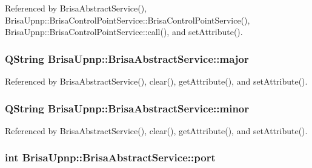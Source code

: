 Referenced by BrisaAbstractService(), BrisaUpnp::BrisaControlPointService::BrisaControlPointService(), BrisaUpnp::BrisaControlPointService::call(), and setAttribute().\hypertarget{classBrisaUpnp_1_1BrisaAbstractService_a1301aa0d68ee3b45dc4158a17d3ab2e9}{
\subsubsection[{major}]{\setlength{\rightskip}{0pt plus 5cm}QString {\bf BrisaUpnp::BrisaAbstractService::major}}}
\label{classBrisaUpnp_1_1BrisaAbstractService_a1301aa0d68ee3b45dc4158a17d3ab2e9}


Referenced by BrisaAbstractService(), clear(), getAttribute(), and setAttribute().\hypertarget{classBrisaUpnp_1_1BrisaAbstractService_a5fedbc9b380612c7c4062b2e25ed3a1c}{
\subsubsection[{minor}]{\setlength{\rightskip}{0pt plus 5cm}QString {\bf BrisaUpnp::BrisaAbstractService::minor}}}
\label{classBrisaUpnp_1_1BrisaAbstractService_a5fedbc9b380612c7c4062b2e25ed3a1c}


Referenced by BrisaAbstractService(), clear(), getAttribute(), and setAttribute().\hypertarget{classBrisaUpnp_1_1BrisaAbstractService_a12d4aea82a4296760ba3f7a27ace68e6}{
\subsubsection[{port}]{\setlength{\rightskip}{0pt plus 5cm}int {\bf BrisaUpnp::BrisaAbstractService::port}}}
\label{classBrisaUpnp_1_1BrisaAbstractService_a12d4aea82a4296760ba3f7a27ace68e6}


